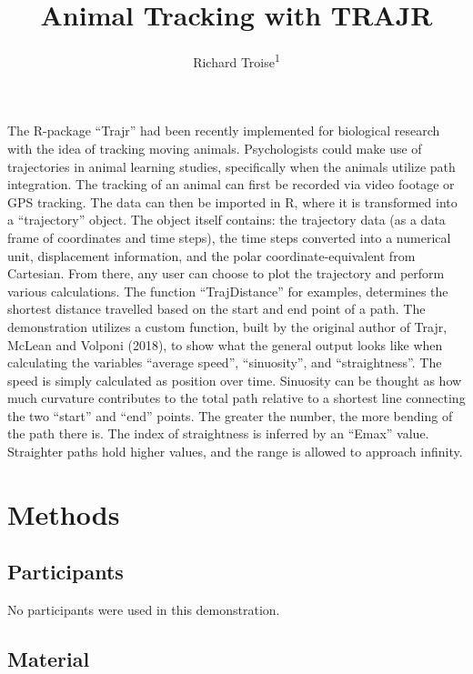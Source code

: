 \documentclass[man]{apa6}
\title{Animal Tracking with TRAJR}
\author{Richard Troise\textsuperscript{1}}
\date{}
\affiliation{
\vspace{0.5cm}
\textsuperscript{1} Brooklyn College}
\begin{document}
\maketitle

The R-package \enquote{Trajr} had been recently implemented for
biological research with the idea of tracking moving animals.
Psychologists could make use of trajectories in animal learning studies,
specifically when the animals utilize path integration. The tracking of
an animal can first be recorded via video footage or GPS tracking. The
data can then be imported in R, where it is transformed into a
\enquote{trajectory} object. The object itself contains: the trajectory
data (as a data frame of coordinates and time steps), the time steps
converted into a numerical unit, displacement information, and the polar
coordinate-equivalent from Cartesian. From there, any user can choose to
plot the trajectory and perform various calculations. The function
\enquote{TrajDistance} for examples, determines the shortest distance
travelled based on the start and end point of a path. The demonstration
utilizes a custom function, built by the original author of Trajr,
McLean and Volponi (2018), to show what the general output looks like
when calculating the variables \enquote{average speed},
\enquote{sinuosity}, and \enquote{straightness}. The speed is simply
calculated as position over time. Sinuosity can be thought as how much
curvature contributes to the total path relative to a shortest line
connecting the two \enquote{start} and \enquote{end} points. The greater
the number, the more bending of the path there is. The index of
straightness is inferred by an \enquote{Emax} value. Straighter paths
hold higher values, and the range is allowed to approach infinity.

\section{Methods}\label{methods}

\subsection{Participants}\label{participants}

No participants were used in this demonstration.

\subsection{Material}\label{material}
\end{document}
